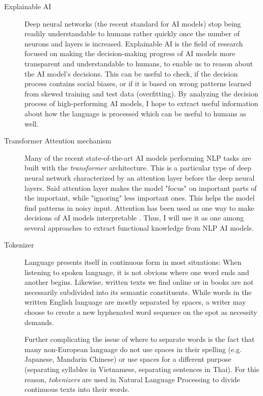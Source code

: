 \begin{description}
	\item [Explainable AI]
	      Deep neural networks (the recent standard for AI models) stop being readily understandable to humans rather quickly once the number of neurons and layers is increased.
	      Explainable AI is the field of research focused on making the decision-making progress of AI models more transparent and understandable to humans, to enable us to reason about the AI model's decisions. 
	      This can be useful to check, if the decision process contains social biases, or if it is based on wrong patterns learned from skewed training and test data (overfitting).
	      By analyzing the decision process of high-performing AI models, I hope to extract useful information about how the language is processed which can be useful to humans as well.

	\item [Transformer Attention mechanism]
	      Many of the recent state-of-the-art AI models performing NLP tasks are built with the \textit{transformer} architecture.
	      This is a particular type of deep neural network characterized by an attention layer before the deep neural layers.
	      Said attention layer makes the model "focus" on important parts of the important, while "ignoring" less important ones.
	      This helps the model find patterns in noisy input.
		  Attention has been used as one way to make decisions of AI models interpretable  .
		  Thus, I will use it as one among several approaches to extract functional knowledge from NLP AI models.

	\item [Tokenizer]
	      Language presents itself in continuous form in most situations:
	      When listening to spoken language, it is not obvious where one word ends and another begins.
	      Likewise, written texts we find online or in books are not necessarily subdivided into its semantic constituents.
	      While words in the written English language are mostly separated by spaces, a writer may choose to create a new hyphenated word sequence on the spot as necessity demands.

Further complicating the issue of where to separate words is the fact that many non-European language do not use spaces in their spelling (e.g. Japanese, Mandarin Chinese) or use spaces for a different purpose (separating syllables in Vietnamese, separating sentences in Thai).
	      For this reason, \textit{tokenizers} are used in Natural Language Processing to divide continuous texts into their words.


\end{description}
